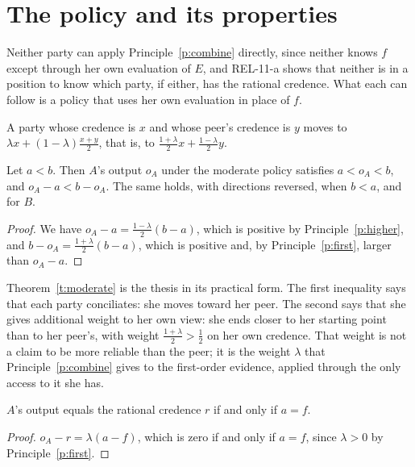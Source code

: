 \documentclass{situationist-preprint}
\begin{document}
\section{The policy and its properties}

Neither party can apply Principle~\ref{p:combine} directly, since neither knows $f$ except through her own evaluation of $E$, and REL-11-a shows that neither is in a position to know which party, if either, has the rational credence. What each can follow is a policy that uses her own evaluation in place of $f$.

\begin{definition}\label{d:policy}
A party whose credence is $x$ and whose peer's credence is $y$ moves to $\lambda x + (1-\lambda)\frac{x+y}{2}$, that is, to $\frac{1+\lambda}{2}x + \frac{1-\lambda}{2}y$.
\end{definition}

\begin{theorem}[Moderation]\label{t:moderate}
Let $a < b$. Then $A$'s output $o_A$ under the moderate policy satisfies $a < o_A < b$, and $o_A - a < b - o_A$. The same holds, with directions reversed, when $b < a$, and for $B$.
\end{theorem}

\begin{proof}
We have $o_A - a = \frac{1-\lambda}{2}(b-a)$, which is positive by Principle~\ref{p:higher}, and $b - o_A = \frac{1+\lambda}{2}(b-a)$, which is positive and, by Principle~\ref{p:first}, larger than $o_A - a$.
\end{proof}

Theorem~\ref{t:moderate} is the thesis in its practical form. The first inequality says that each party conciliates: she moves toward her peer. The second says that she gives additional weight to her own view: she ends closer to her starting point than to her peer's, with weight $\frac{1+\lambda}{2} > \frac{1}{2}$ on her own credence. That weight is not a claim to be more reliable than the peer; it is the weight $\lambda$ that Principle~\ref{p:combine} gives to the first-order evidence, applied through the only access to it she has.

\begin{proposition}\label{p:right}
$A$'s output equals the rational credence $r$ if and only if $a = f$.
\end{proposition}

\begin{proof}
$o_A - r = \lambda(a - f)$, which is zero if and only if $a = f$, since $\lambda > 0$ by Principle~\ref{p:first}.
\end{proof}
\end{document}
